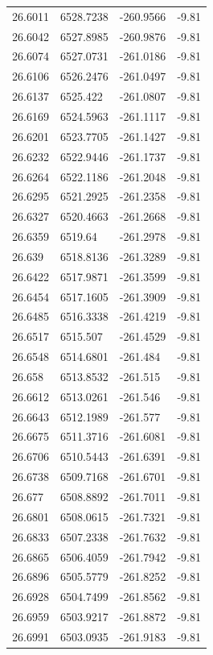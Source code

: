 \begin{table}[H]
\begin{tabular}{llll}
26.6011 & 6528.7238 & -260.9566 & -9.81 \\
26.6042 & 6527.8985 & -260.9876 & -9.81 \\
26.6074 & 6527.0731 & -261.0186 & -9.81 \\
26.6106 & 6526.2476 & -261.0497 & -9.81 \\
26.6137 & 6525.422 & -261.0807 & -9.81 \\
26.6169 & 6524.5963 & -261.1117 & -9.81 \\
26.6201 & 6523.7705 & -261.1427 & -9.81 \\
26.6232 & 6522.9446 & -261.1737 & -9.81 \\
26.6264 & 6522.1186 & -261.2048 & -9.81 \\
26.6295 & 6521.2925 & -261.2358 & -9.81 \\
26.6327 & 6520.4663 & -261.2668 & -9.81 \\
26.6359 & 6519.64 & -261.2978 & -9.81 \\
26.639 & 6518.8136 & -261.3289 & -9.81 \\
26.6422 & 6517.9871 & -261.3599 & -9.81 \\
26.6454 & 6517.1605 & -261.3909 & -9.81 \\
26.6485 & 6516.3338 & -261.4219 & -9.81 \\
26.6517 & 6515.507 & -261.4529 & -9.81 \\
26.6548 & 6514.6801 & -261.484 & -9.81 \\
26.658 & 6513.8532 & -261.515 & -9.81 \\
26.6612 & 6513.0261 & -261.546 & -9.81 \\
26.6643 & 6512.1989 & -261.577 & -9.81 \\
26.6675 & 6511.3716 & -261.6081 & -9.81 \\
26.6706 & 6510.5443 & -261.6391 & -9.81 \\
26.6738 & 6509.7168 & -261.6701 & -9.81 \\
26.677 & 6508.8892 & -261.7011 & -9.81 \\
26.6801 & 6508.0615 & -261.7321 & -9.81 \\
26.6833 & 6507.2338 & -261.7632 & -9.81 \\
26.6865 & 6506.4059 & -261.7942 & -9.81 \\
26.6896 & 6505.5779 & -261.8252 & -9.81 \\
26.6928 & 6504.7499 & -261.8562 & -9.81 \\
26.6959 & 6503.9217 & -261.8872 & -9.81 \\
26.6991 & 6503.0935 & -261.9183 & -9.81 \\

\end{tabular}
\end{table}
